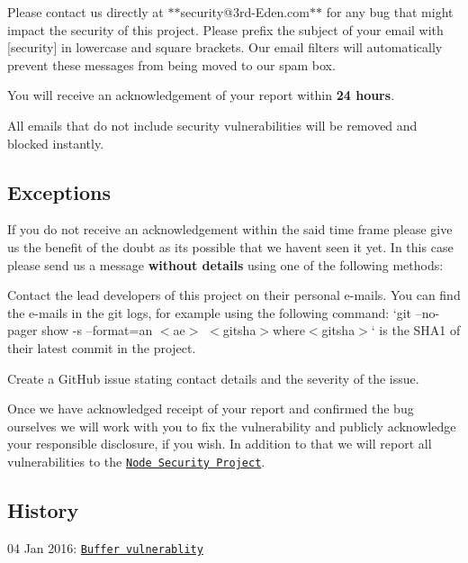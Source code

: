 Please contact us directly at $\ast$$\ast$security@3rd-\/\+Eden.\+com$\ast$$\ast$ for any bug that might impact the security of this project. Please prefix the subject of your email with {\ttfamily \mbox{[}security\mbox{]}} in lowercase and square brackets. Our email filters will automatically prevent these messages from being moved to our spam box.

You will receive an acknowledgement of your report within {\bfseries 24 hours}.

All emails that do not include security vulnerabilities will be removed and blocked instantly.

\subsection*{Exceptions}

If you do not receive an acknowledgement within the said time frame please give us the benefit of the doubt as it\textquotesingle{}s possible that we haven\textquotesingle{}t seen it yet. In this case please send us a message {\bfseries without details} using one of the following methods\+:


\begin{DoxyItemize}
\item Contact the lead developers of this project on their personal e-\/mails. You can find the e-\/mails in the git logs, for example using the following command\+: `git --no-\/pager show -\/s --format=\textquotesingle{}an $<$ae$>$\textquotesingle{} $<$gitsha$>${\ttfamily where}$<$gitsha$>$` is the S\+H\+A1 of their latest commit in the project.
\item Create a Git\+Hub issue stating contact details and the severity of the issue.
\end{DoxyItemize}

Once we have acknowledged receipt of your report and confirmed the bug ourselves we will work with you to fix the vulnerability and publicly acknowledge your responsible disclosure, if you wish. In addition to that we will report all vulnerabilities to the \href{https://nodesecurity.io/}{\tt Node Security Project}.

\subsection*{History}

04 Jan 2016\+: \href{https://github.com/websockets/ws/releases/tag/1.0.1}{\tt Buffer vulnerablity} 